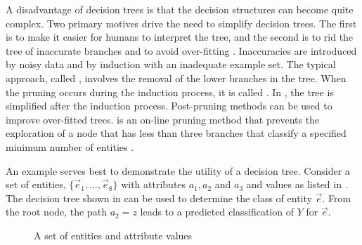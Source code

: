 A disadvantage of decision trees is that the decision structures can become quite complex. Two primary motives drive the need to simplify decision trees.  The first is to make it easier for humans to interpret the tree, and the second is to rid the tree of inaccurate branches and to avoid over-fitting \cite{kubat:review}.  Inaccuracies are introduced by noisy data and by induction with an inadequate example set.  The typical approach, called  , involves the removal of the lower branches in the tree. When the pruning occurs during the induction process, it is called .  In , the tree is simplified after the induction process.  Post-pruning methods can be used to improve over-fitted trees.  is an on-line pruning method that prevents the exploration of a node that has less than three branches that classify a specified minimum number of entities \cite{quinlan:c45}. 

An example serves best to demonstrate the utility of a decision tree. Consider a set of entities, $\{\vec e_1,\ldots, \vec e_8\}$ with attributes $a_1,a_2$ and $a_3$ and values as listed in .  The decision tree shown in  can be used to determine the class of entity $\vec e$.  From the root node, the path $a_2 = z$ leads to a predicted classification of $Y$ for $\vec e$.  

\begin{figure} [!ht]
\centering
{}
\caption{A set of entities and attribute values}
\end{figure}

